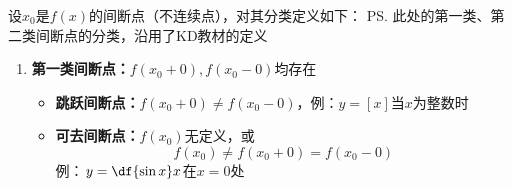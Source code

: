 设$x_0$是$f(x)$的间断点（不连续点），对其分类定义如下：
\ps{此处的第一类、第二类间断点的分类，沿用了KD教材的定义}
\begin{enumerate}[(1)]
  \setlength{\itemindent}{1cm}
  \item {\bf 第一类间断点：}$f(x_0+0),f(x_0-0)$均存在
  \begin{itemize}
    \item {\bf 跳跃间断点：}$f(x_0+0)\ne f(x_0-0)$，例：$y=[x]$当$x$为整数时
    \begin{center}
 	\end{center}
    \item {\bf 可去间断点：}$f(x_0)$无定义，或
    $$f(x_0)\ne f(x_0+0)=f(x_0-0)$$
    例：$y=\df{\sin x}x$在$x=0$处
    \begin{center}
 	\end{center}
  \end{itemize}

\end{enumerate}
